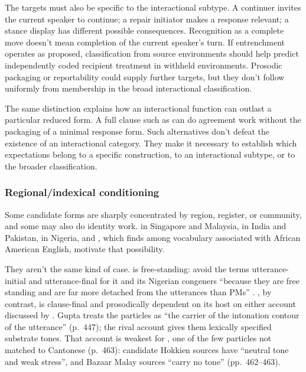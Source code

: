 \documentclass[12pt]{article}
\begin{document}
The targets must also be specific to the interactional subtype. A continuer invites the current speaker to continue; a repair initiator makes a response relevant; a stance display has different possible consequences. Recognition as a complete move doesn't mean completion of the current speaker's turn. If entrenchment operates as proposed, classification from source environments should help predict independently coded recipient treatment in withheld environments. Prosodic packaging or reportability could supply further targets, but they don't follow uniformly from membership in the broad interactional classification.

The same distinction explains how an interactional function can outlast a particular reduced form. A full clause such as  can do agreement work without the packaging of a minimal response form. Such alternatives don't defeat the existence of an interactional category. They make it necessary to establish which expectations belong to a specific construction, to an interactional subtype, or to the broader classification.

\subsubsection{Regional/indexical conditioning}

Some candidate forms are sharply concentrated by region, register, or community, and some may also do identity work.  in Singapore and Malaysia,  in India and Pakistan,  in Nigeria, and , which \textcite[8]{louf2023} finds among vocabulary associated with African American English, motivate that possibility.

They aren't the same kind of case.  is free-standing: \textcite{unuabonahdaniel2020} avoid the terms utterance-initial and utterance-final for it and its Nigerian congeners \enquote{because they are free standing and are far more detached from the utterances than PMs} \citep[69]{unuabonahdaniel2020}. , by contrast, is clause-final and prosodically dependent on its host on either account discussed by \textcite{lim2007}. Gupta treats the particles as \enquote{the carrier of the intonation contour of the utterance} (p.~447); the rival account gives them lexically specified substrate tones. That account is weakest for , one of the few particles not matched to Cantonese (p.~463): candidate Hokkien sources have \enquote{neutral tone and weak stress}, and Bazaar Malay sources \enquote{carry no tone} (pp.~462--463).
\end{document}
